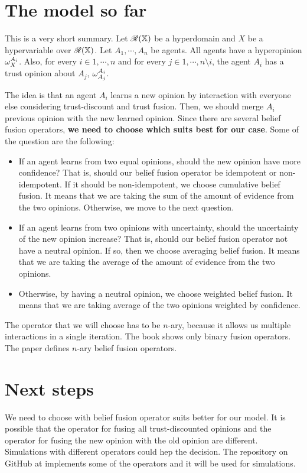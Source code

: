 \documentclass[a4paper,12pt]{article}
\theoremstyle{definition}
\theoremstyle{theorem}
\numberwithin{equation}{section}
\begin{document}
\section{The model so far}

This is a very short summary. Let $\mathcal{R}(\mathbb{X})$ be a hyperdomain and $X$ be a hypervariable over $\mathcal{R}(\mathbb{X})$. Let $A_1, \cdots, A_n$ be agents. All agents have a hyperopinion $\omega^{A_i}_{X}$. Also, for every $i \in {1, \cdots, n}$ and for every $j \in {1, \cdots, n} \setminus {i}$, the agent $A_i$ has a trust opinion about $A_j$, $\omega^{A_i}_{A_j}$.

The idea is that an agent $A_i$ learns a new opinion by interaction with everyone else considering trust-discount and trust fusion. Then, we should merge $A_i$ previous opinion with the new learned opinion. Since there are several belief fusion operators, \textbf{we need to choose which suits best for our case}. Some of the question are the following:
\begin{itemize}
\item If an agent learns from two equal opinions, should the new opinion have more confidence? That is, should our belief fusion operator be idempotent or non-idempotent. If it should be non-idempotent, we choose cumulative belief fusion. It means that we are taking the sum of the amount of evidence from the two opinions. Otherwise, we move to the next question.
\item If an agent learns from two opinions with uncertainty, should the uncertainty of the new opinion increase? That is, should our belief fusion operator not have a neutral opinion. If so, then we choose averaging belief fusion. It means that we are taking the average of the amount of evidence from the two opinions.
\item Otherwise, by having a neutral opinion, we choose weighted belief fusion. It means that we are taking average of the two opinions weighted by confidence.
\end{itemize}

The operator that we will choose has to be $n$-ary, because it allows us multiple interactions in a single iteration. The book \cite{DBLP:books/sp/Josang16} shows only binary fusion operators. The paper \cite{josang2018categories} defines $n$-ary belief fusion operators.


\section{Next steps}

We need to choose with belief fusion operator suits better for our model. It is possible that the operator for fusing all trust-discounted opinions and the operator for fusing the new opinion with the old opinion are different. Simulations with different operators could hep the decision. The repository on GitHub at \cite{oliveira2021subjective} implements some of the operators and it will be used for simulations.


\printbibliography
\end{document}
